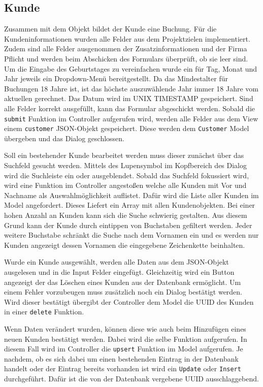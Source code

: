 \subsection{Kunde}
Zusammen mit dem Objekt bildet der Kunde eine Buchung. Für die Kundeninformationen wurden alle Felder aus dem Projektzielen implementiert. Zudem sind alle Felder ausgenommen der Zusatzinformationen und der Firma Pflicht und werden beim Abschicken des Formulars überprüft, ob sie leer sind. Um die Eingabe des Geburtstages zu vereinfachen wurde ein für Tag, Monat und Jahr jeweils ein Dropdown-Menü bereitgestellt. Da das Mindestalter für Buchungen 18 Jahre ist, ist das höchste auszuwählende Jahr immer 18 Jahre vom aktuellen gerechnet. Das Datum wird im UNIX TIMESTAMP gespeichert. Sind alle Felder korrekt ausgefüllt, kann das Formular abgeschickt werden. Sobald die \texttt{submit} Funktion im Controller aufgerufen wird, werden alle Felder aus dem View einem \texttt{customer} JSON-Objekt gespeichert. Diese werden dem \texttt{Customer} Model übergeben und das Dialog geschlossen.

Soll ein bestehender Kunde bearbeitet werden muss dieser zunächst über das Suchfeld gesucht werden. Mittels des Lupensymbol im Kopfbereich des Dialog wird die Suchleiste ein oder ausgeblendet. Sobald das Suchfeld fokussiert wird, wird eine Funktion im Controller angestoßen welche alle Kunden mit Vor und Nachname als Auswahlmöglichkeit auflistet. Dafür wird die Liste aller Kunden im Model angefordert. Dieses Liefert ein Array mit allen Kundenobjekten. Bei einer hohen Anzahl an Kunden kann sich die Suche schwierig gestalten. Aus diesem Grund kann der Kunde durch eintippen von Buchstaben gefiltert werden. Jeder weitere Buchstabe schränkt die Suche nach dem Vornamen ein und es werden nur Kunden angezeigt dessen Vornamen die eingegebene Zeichenkette beinhalten.

Wurde ein Kunde ausgewählt, werden alle Daten aus dem JSON-Objekt ausgelesen und in die Input Felder eingefügt. Gleichzeitig wird ein Button angezeigt der das Löschen eines Kunden aus der Datenbank ermöglicht. Um einem Fehler vorzubeugen muss zusätzlich noch ein Dialog bestätigt werden. Wird dieser bestätigt übergibt der Controller dem Model die UUID des Kunden in einer \texttt{delete} Funktion.

Wenn Daten verändert wurden, können diese wie auch beim Hinzufügen eines neuen Kunden bestätigt werden. Dabei wird die selbe Funktion aufgerufen. In diesem Fall wird im Controller die \texttt{upsert} Funktion im Model aufgerufen. Je nachdem, ob es sich dabei um einen bestehenden Eintrag in der Datenbank handelt oder der Eintrag bereits vorhanden ist wird ein \texttt{Update} oder \texttt{Insert} durchgeführt. Dafür ist die von der Datenbank vergebene UUID ausschlaggebend.

